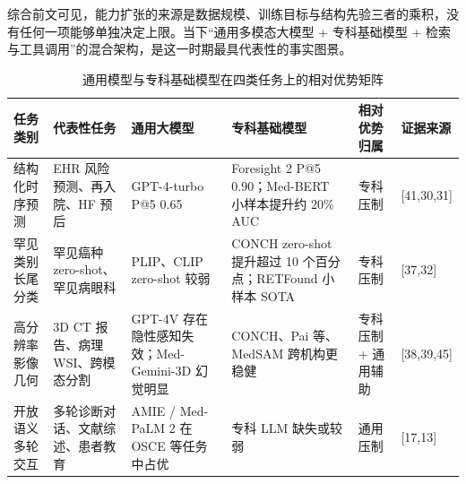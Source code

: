 综合前文可见，能力扩张的来源是数据规模、训练目标与结构先验三者的乘积，没有任何一项能够单独决定上限。当下“通用多模态大模型 + 专科基础模型 + 检索与工具调用”的混合架构，是这一时期最具代表性的事实图景。

\begin{table}[htbp]
\centering
\caption{通用模型与专科基础模型在四类任务上的相对优势矩阵}
\label{tab:specialist-matrix}
\scriptsize
\begin{tabularx}{\textwidth}{L{2.3cm} L{2.5cm} Y Y L{2cm} L{1.6cm}}
\toprule
任务类别 & 代表性任务 & 通用大模型 & 专科基础模型 & 相对优势归属 & 证据来源 \\
\midrule
结构化时序预测 & EHR 风险预测、再入院、HF 预后 & GPT-4-turbo P@5 0.65 & Foresight 2 P@5 0.90；Med-BERT 小样本提升约 20\% AUC & 专科压制 & [41,30,31] \\
罕见类别长尾分类 & 罕见癌种 zero-shot、罕见病眼科 & PLIP、CLIP zero-shot 较弱 & CONCH zero-shot 提升超过 10 个百分点；RETFound 小样本 SOTA & 专科压制 & [37,32] \\
高分辨率影像几何 & 3D CT 报告、病理 WSI、跨模态分割 & GPT-4V 存在隐性感知失效；Med-Gemini-3D 幻觉明显 & CONCH、Pai 等、MedSAM 跨机构更稳健 & 专科压制 + 通用辅助 & [38,39,45] \\
开放语义多轮交互 & 多轮诊断对话、文献综述、患者教育 & AMIE / Med-PaLM 2 在 OSCE 等任务中占优 & 专科 LLM 缺失或较弱 & 通用压制 & [17,13] \\
\bottomrule
\end{tabularx}
\end{table}
